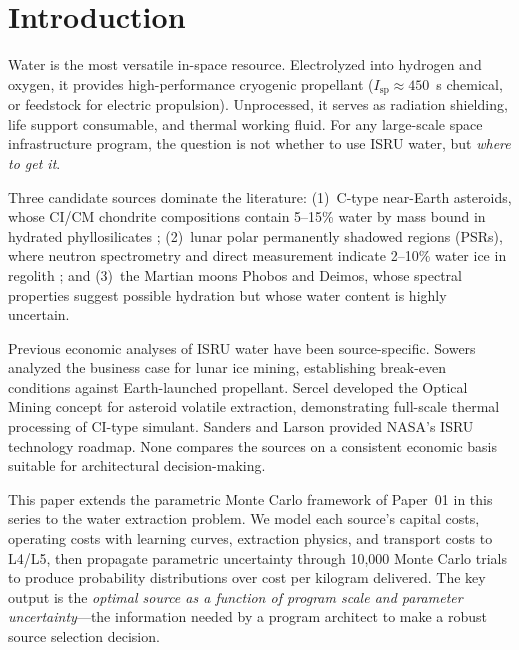 \documentclass[preprint,12pt]{elsarticle}
\begin{document}
\linenumbers

\section{Introduction}
\label{sec:introduction}

Water is the most versatile in-space resource. Electrolyzed into hydrogen and oxygen, it provides high-performance cryogenic propellant ($I_\text{sp} \approx 450$~s chemical, or feedstock for electric propulsion). Unprocessed, it serves as radiation shielding, life support consumable, and thermal working fluid. For any large-scale space infrastructure program, the question is not whether to use ISRU water, but \emph{where to get it}.

Three candidate sources dominate the literature: (1)~C-type near-Earth asteroids, whose CI/CM chondrite compositions contain 5--15\% water by mass bound in hydrated phyllosilicates \cite{lauretta2024}; (2)~lunar polar permanently shadowed regions (PSRs), where neutron spectrometry and direct measurement indicate 2--10\% water ice in regolith \cite{colaprete2010}; and (3)~the Martian moons Phobos and Deimos, whose spectral properties suggest possible hydration but whose water content is highly uncertain.

Previous economic analyses of ISRU water have been source-specific. Sowers \cite{sowers2016} analyzed the business case for lunar ice mining, establishing break-even conditions against Earth-launched propellant. Sercel \cite{sercel2019} developed the Optical Mining concept for asteroid volatile extraction, demonstrating full-scale thermal processing of CI-type simulant. Sanders and Larson \cite{sanders2013} provided NASA's ISRU technology roadmap. None compares the sources on a consistent economic basis suitable for architectural decision-making.

This paper extends the parametric Monte Carlo framework of Paper~01 in this series \cite{hakkenberg2026isru} to the water extraction problem. We model each source's capital costs, operating costs with learning curves, extraction physics, and transport costs to L4/L5, then propagate parametric uncertainty through 10,000 Monte Carlo trials to produce probability distributions over cost per kilogram delivered. The key output is the \emph{optimal source as a function of program scale and parameter uncertainty}---the information needed by a program architect to make a robust source selection decision.
\end{document}
